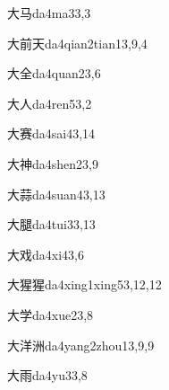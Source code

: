 \begin{verbete}{大马}{da4ma3}{3,3}
\end{verbete}

\begin{verbete}{大前天}{da4qian2tian1}{3,9,4}
\end{verbete}

\begin{verbete}{大全}{da4quan2}{3,6}
\end{verbete}

\begin{verbete}{大人}{da4ren5}{3,2}
\end{verbete}

\begin{verbete}{大赛}{da4sai4}{3,14}
\end{verbete}

\begin{verbete}{大神}{da4shen2}{3,9}
\end{verbete}

\begin{verbete}{大蒜}{da4suan4}{3,13}
\end{verbete}

\begin{verbete}{大腿}{da4tui3}{3,13}
\end{verbete}

\begin{verbete}{大戏}{da4xi4}{3,6}
\end{verbete}

\begin{verbete}{大猩猩}{da4xing1xing5}{3,12,12}
\end{verbete}

\begin{verbete}{大学}{da4xue2}{3,8}
\end{verbete}

\begin{verbete}{大洋洲}{da4yang2zhou1}{3,9,9}
\end{verbete}

\begin{verbete}{大雨}{da4yu3}{3,8}
\end{verbete}

